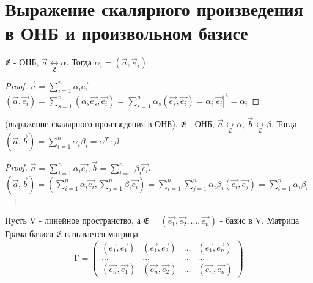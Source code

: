 \section{Выражение скалярного произведения в ОНБ и произвольном базисе}
\begin{proposition}
	\(\mathfrak{E}\) - ОНБ, \(\vec{a}\underset{\mathfrak{E}}{\longleftrightarrow}\alpha\). Тогда \(\alpha_i = (\vec{a}, \vec{e}_i)\)
\end{proposition}
\begin{proof}
	\(\vec{a} = \sum_{i = 1}^{n}\alpha_i\vec{e_i}\) \\[5mm]
	\((\vec{a}, \vec{e_i}) = \sum_{s = 1}^{n}(\alpha_s\vec{e_s}, \vec{e_i}) = \sum_{s = 1}^{n}\alpha_s(\vec{e_s}, \vec{e_i}) = \alpha_i|\vec{e_i}|^2 = \alpha_i\)
\end{proof}
\begin{theorem}
	(выражение скалярного произведения в ОНБ). 
	\(\mathfrak{E}\) - ОНБ, \(\vec{a}\underset{\mathfrak{E}}{\longleftrightarrow}\alpha\), 
	\(\vec{b}\underset{\mathfrak{E}}{\longleftrightarrow}\beta\). Тогда \((\vec{a}, \vec{b}) = \sum_{i = 1}^{n}\alpha_i\beta_i = \alpha^T\cdot\beta\)
\end{theorem}
\begin{proof}
	\(\vec{a} = \sum_{i = 1}^{n}\alpha_i\vec{e_i}, \vec{b} = \sum_{i = 1}^{n}\beta_i\vec{e_i}\). \\[5mm]
	\((\vec{a}, \vec{b}) = (\sum_{i = 1}^{n}\alpha_i\vec{e_i}, \sum_{j = 1}^{n}\beta_i\vec{e_i}) = \sum_{i = 1}^{n}\sum_{j = 1}^{n}\alpha_i\beta_i(\vec{e_i}, \vec{e_j}) = \sum_{i = 1}^{n}\alpha_i\beta_i\)
\end{proof}
\begin{definition}
	Пусть V - линейное пространство, а \(\mathfrak{E} = (\vec{e_1}, \vec{e_2}, \ldots, \vec{e_n})\) - базис в V. Матрица Грама базиса \(\mathfrak{E}\) называется матрица 
	\[ 
	\text{Г} = 
	\begin{pmatrix}
	(\vec{e_1}, \vec{e_1}) & (\vec{e_1}, \vec{e_2}) & \ldots & (\vec{e_1}, \vec{e_n}) \\
	\ldots & \ldots & \ldots & \ldots \\
	(\vec{e_n}, \vec{e_1}) & (\vec{e_n}, \vec{e_2}) & \ldots & (\vec{e_n}, \vec{e_n})
	\end{pmatrix}
	\]
\end{definition}

